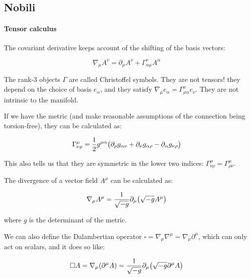 \documentclass[main.tex]{subfiles}
\begin{document}
\subsection{Nobili}

\paragraph{Tensor calculus}

The covariant derivative keeps account of the shifting of the basis vectors:

\begin{equation}
    \nabla_\mu A^\nu = \partial_\mu A^\nu + \Gamma^\nu _{\alpha \mu}  A^\alpha
\end{equation}

The rank-3 objects $\Gamma$ are called Christoffel symbols. They are not tensors! they depend on the choice of basis $e_\alpha$, and they satisfy $\nabla _\mu e_\alpha = \Gamma ^\nu _{\mu \alpha} e_\nu$. They are not intrinsic to the manifold.

If we have the metric (and make reasonable assumptions of the connection being torsion-free), they can be calculated as:

\begin{equation}
    \Gamma^\mu_{\nu \rho} = \frac{1}{2} g^{\mu \alpha} \qty(
    \partial_\rho g_{\alpha \nu} +
    \partial_\nu g_{\alpha \rho} -
    \partial_\alpha g_{\nu \rho}
    ) \label{eq:christoffel-symbols-from-metric}
\end{equation}

This also tells us that they are symmetric in the lower two indices: $\Gamma ^\mu _{\nu \rho} = \Gamma ^\mu _{\rho \nu}$.

The divergence of a vector field $A^\mu$ can be calculated as:

\begin{equation}
    \nabla_\mu A^\mu = \frac{1}{\sqrt{-g}}\partial_\mu \qty(\sqrt{-g}A^\mu) \label{eq:covariant-divergence}
\end{equation}

where $g$ is the determinant of the metric.

We can also define the Dalambertian operator $\square = \nabla_\mu \nabla^\mu = \nabla_\mu \partial^\mu$, which can only act on scalars, and it does so like:

\begin{equation}
    \square A = \nabla_\mu (\partial^\mu A) =  \frac{1}{\sqrt{-g}}\partial_\mu \qty(\sqrt{-g}\partial^\mu A)
\end{equation}
\end{document}
